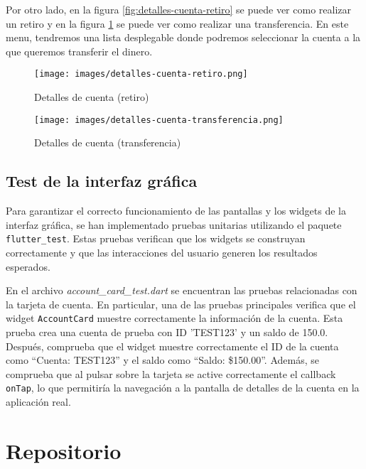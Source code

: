 \documentclass[12pt]{article}
\begin{document}
Por otro lado, en la figura \ref{fig:detalles-cuenta-retiro} se puede ver como realizar un retiro y en la figura \ref{fig:detalles-cuenta-transferencia} se puede ver como realizar una transferencia. En este menu, tendremos una lista desplegable donde podremos seleccionar la cuenta a la que queremos transferir el dinero.

\begin{figure}[H]
    \centering
    \begin{minipage}[b]{0.48\textwidth}
        \centering
        \texttt{[image: images/detalles-cuenta-retiro.png]}
        \caption{Detalles de cuenta (retiro)}
        \label{fig:detalles-cuenta-retiro}
    \end{minipage}
    \hfill
    \begin{minipage}[b]{0.48\textwidth}
        \centering
        \texttt{[image: images/detalles-cuenta-transferencia.png]}
        \caption{Detalles de cuenta (transferencia)}
        \label{fig:detalles-cuenta-transferencia}
    \end{minipage}
\end{figure}

\subsection{Test de la interfaz gráfica}

Para garantizar el correcto funcionamiento de las pantallas y los widgets de la interfaz gráfica, se han implementado pruebas unitarias utilizando el paquete \texttt{flutter\_test}. Estas pruebas verifican que los widgets se construyan correctamente y que las interacciones del usuario generen los resultados esperados.

En el archivo \textit{account\_card\_test.dart} se encuentran las pruebas relacionadas con la tarjeta de cuenta. En particular, una de las pruebas principales verifica que el widget \texttt{AccountCard} muestre correctamente la información de la cuenta. Esta prueba crea una cuenta de prueba con ID 'TEST123' y un saldo de 150.0. Después, comprueba que el widget muestre correctamente el ID de la cuenta como ``Cuenta: TEST123'' y el saldo como ``Saldo: \$150.00''. Además, se comprueba que al pulsar sobre la tarjeta se active correctamente el callback \texttt{onTap}, lo que permitiría la navegación a la pantalla de detalles de la cuenta en la aplicación real.

\section{Repositorio}
\end{document}
